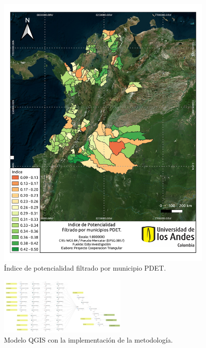 \begin{figure}
    \centering
    \includegraphics[width=0.95\textwidth]{figures/porpdet}
    \caption{Índice de potencialidad filtrado por municipio PDET.}
    \label{fig:porpdet}
\end{figure}

\begin{figure}
    \centering
    \includegraphics[angle=90, width=0.56\textwidth]{figures/modelo}
    \caption{Modelo QGIS con la implementación de la metodología.}
    \label{fig:modelo}
\end{figure}
